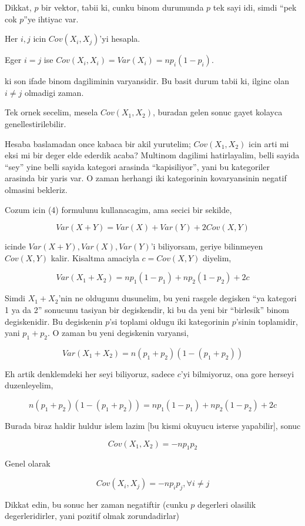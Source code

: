 \documentclass[12pt,fleqn]{article}\usepackage{../common}
\begin{document}
Dikkat, $p$ bir vektor, tabii ki, cunku binom durumunda $p$ tek sayi idi,
simdi ``pek cok $p$''ye ihtiyac var. 

Her $i,j$ icin $Cov(X_i,X_j)$'yi hesapla. 

Eger $i=j$ ise $Cov(X_i,X_i)=Var(X_i) = np_i(1-p_i)$. 

ki son ifade binom dagiliminin varyansidir. Bu basit durum tabii ki, ilginc
olan $i \ne j$ olmadigi zaman. 

Tek ornek secelim, mesela $Cov(X_1,X_2)$, buradan gelen sonuc gayet kolayca
genellestirilebilir. 

Hesaba baslamadan once kabaca bir akil yurutelim; $Cov(X_1,X_2)$ icin arti
mi eksi mi bir deger elde ederdik acaba? Multinom dagilimi hatirlayalim,
belli sayida ``sey'' yine belli sayida kategori arasinda ``kapisiliyor'',
yani bu kategoriler arasinda bir yaris var. O zaman herhangi iki
kategorinin kovaryansinin negatif olmasini bekleriz. 

Cozum icin (4) formulunu kullanacagim, ama secici bir sekilde, 

$$ Var(X+Y) = Var(X) + Var(Y) + 2Cov(X,Y) $$

icinde $Var(X+Y),Var(X),Var(Y)$'i biliyorsam, geriye bilinmeyen $Cov(X,Y)$
kalir. Kisaltma amaciyla $c = Cov(X,Y)$ diyelim,

$$ Var(X_1+X_2) = np_1(1-p_1) + np_2(1-p_2) + 2c$$

Simdi $X_1+X_2$'nin ne oldugunu dusunelim, bu yeni rasgele degisken ``ya
kategori 1 ya da 2'' sonucunu tasiyan bir degiskendir, ki bu da yeni bir
``birlesik'' binom degiskenidir. Bu degiskenin $p$'si toplami oldugu iki
kategorinin $p$'sinin toplamidir, yani $p_1+p_2$. O zaman bu yeni
degiskenin varyansi, 

$$ Var(X_1+X_2) = n(p_1+p_2)(1-(p_1+p_2))  $$

Eh artik denklemdeki her seyi biliyoruz, sadece $c$'yi bilmiyoruz, ona gore
herseyi duzenleyelim, 

$$ n(p_1+p_2)(1-(p_1+p_2))  = np_1(1-p_1) + np_2(1-p_2) + 2c $$

Burada biraz haldir huldur islem lazim [bu kismi okuyucu isterse
yapabilir], sonuc

$$ Cov(X_1,X_2) = -np_1p_2 $$

Genel olarak 

$$ Cov(X_i,X_j) = -np_ip_j, \forall i \ne j $$

Dikkat edin, bu sonuc her zaman negatiftir (cunku $p$ degerleri olasilik
degerleridirler, yani pozitif olmak zorundadirlar)
\end{document}
